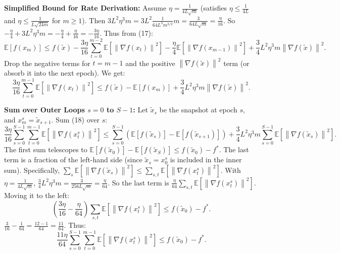 \documentclass{article}
\newcommand{\E}{\mathbb{E}}
\newcommand{\norm}[1]{\left\| #1 \right\|}
\newcommand{\grad}{\nabla}
\newcommand{\step}[1]{\text{\color{blue}[Step #1]}}
\begin{document}
\step{20} \textbf{Simplified Bound for Rate Derivation:}
Assume $\eta = \frac{1}{4 L \sqrt{m}}$ (satisfies $\eta \le \frac{1}{4L}$ and $\eta \le \frac{1}{L\sqrt{24m}}$ for $m\ge 1$).
Then $3 L^2 \eta^3 m = 3 L^2 \frac{1}{64 L^3 m^{3/2}} m = \frac{3}{64 L \sqrt{m}} = \frac{\eta}{16}$.
So $-\frac{\eta}{4} + 3 L^2 \eta^3 m = -\frac{\eta}{4} + \frac{\eta}{16} = -\frac{3\eta}{16}$.
Thus from (17):
\begin{equation}
    \E[f(x_m)] \le f(\tilde{x}) - \frac{3\eta}{16} \sum_{t=0}^{m-2} \E[\norm{\grad f(x_t)}^2] - \frac{\eta}{4} \E[\norm{\grad f(x_{m-1})}^2] + \frac{3}{4} L^2 \eta^3 m \norm{\grad f(\tilde{x})}^2.
\end{equation}
Drop the negative terms for $t=m-1$ and the positive $\norm{\grad f(\tilde{x})}^2$ term (or absorb it into the next epoch). We get:
\begin{equation}
    \frac{3\eta}{16} \sum_{t=0}^{m-1} \E[\norm{\grad f(x_t)}^2] \le f(\tilde{x}) - \E[f(x_m)] + \frac{3}{4} L^2 \eta^3 m \norm{\grad f(\tilde{x})}^2. \tag{18}
\end{equation}

\step{21} \textbf{Sum over Outer Loops $s=0$ to $S-1$:}
Let $\tilde{x}_s$ be the snapshot at epoch $s$, and $x_{m}^s = \tilde{x}_{s+1}$.
Sum (18) over $s$:
\begin{equation}
    \frac{3\eta}{16} \sum_{s=0}^{S-1} \sum_{t=0}^{m-1} \E[\norm{\grad f(x_t^s)}^2] \le \sum_{s=0}^{S-1} \left( \E[f(\tilde{x}_s)] - \E[f(\tilde{x}_{s+1})] \right) + \frac{3}{4} L^2 \eta^3 m \sum_{s=0}^{S-1} \E[\norm{\grad f(\tilde{x}_s)}^2].
\end{equation}
The first sum telescopes to $\E[f(\tilde{x}_0)] - \E[f(\tilde{x}_S)] \le f(\tilde{x}_0) - f^*$.
The last term is a fraction of the left-hand side (since $\tilde{x}_s = x_0^s$ is included in the inner sum). Specifically, $\sum_{s} \E[\norm{\grad f(\tilde{x}_s)}^2] \le \sum_{s,t} \E[\norm{\grad f(x_t^s)}^2]$.
With $\eta = \frac{1}{4 L \sqrt{m}}$, $\frac{3}{4} L^2 \eta^3 m = \frac{3}{256 L \sqrt{m}} = \frac{\eta}{64}$.
So the last term is $\frac{\eta}{64} \sum_{s,t} \E[\norm{\grad f(x_t^s)}^2]$.
Moving it to the left:
\begin{equation}
    \left( \frac{3\eta}{16} - \frac{\eta}{64} \right) \sum_{s,t} \E[\norm{\grad f(x_t^s)}^2] \le f(\tilde{x}_0) - f^*.
\end{equation}
$\frac{3}{16} - \frac{1}{64} = \frac{12-1}{64} = \frac{11}{64}$.
Thus:
\begin{equation}
    \frac{11 \eta}{64} \sum_{s=0}^{S-1} \sum_{t=0}^{m-1} \E[\norm{\grad f(x_t^s)}^2] \le f(\tilde{x}_0) - f^*. \tag{19}
\end{equation}
\end{document}
